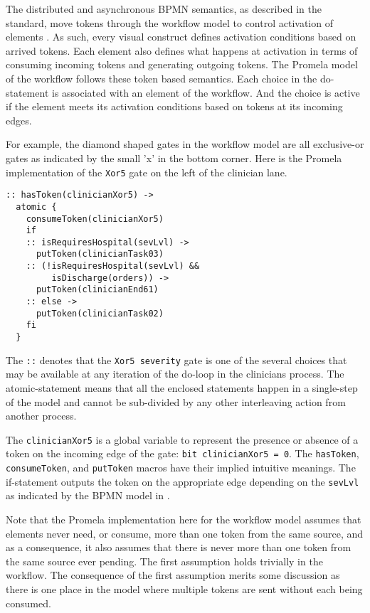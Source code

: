 The distributed and asynchronous BPMN semantics, as described in the standard, move tokens through the workflow model to control activation of elements \cite{BPMNSpecification}. As such, every visual construct defines activation conditions based on arrived tokens. Each element also defines what happens at activation in terms of consuming incoming tokens and generating outgoing tokens. The Promela model of the workflow follows these token based semantics. Each choice in the do-statement is associated with an element of the workflow. And the choice is active if the element meets its activation conditions based on tokens at its incoming edges.

For example, the diamond shaped gates in the workflow model are all exclusive-or gates as indicated by the small 'x' in the bottom corner. Here is the Promela implementation of the \texttt{Xor5} gate on the left of the clinician lane.
%
{\small
\begin{lstlisting}[style=myPromela]
:: hasToken(clinicianXor5) ->
  atomic {
    consumeToken(clinicianXor5)
    if
    :: isRequiresHospital(sevLvl) ->
      putToken(clinicianTask03)
    :: (!isRequiresHospital(sevLvl) && 
         isDischarge(orders)) ->
      putToken(clinicianEnd61)
    :: else ->
      putToken(clinicianTask02)
    fi
  }
\end{lstlisting}
}
% 
\noindent The \texttt{::} denotes that the \texttt{Xor5 severity} gate is one of the several choices that may be available at any iteration of the do-loop in the clinicians process. The atomic-statement means that all the enclosed statements happen in a single-step of the model and cannot be sub-divided by any other interleaving action from another process.

The \texttt{clinicianXor5} is a global variable to represent the presence or absence of a token on the incoming edge of the gate: \texttt{bit clinicianXor5 = 0}. The \texttt{hasToken}, \texttt{consumeToken}, and \texttt{putToken} macros have their implied intuitive meanings. The if-statement outputs the token on the appropriate edge depending on the \texttt{sevLvl} as indicated by the BPMN model in . 

Note that the Promela implementation here for the workflow model assumes that elements never need, or consume, more than one token from the same source, and as a consequence, it also assumes that there is never more than one token from the same source ever pending. The first assumption holds trivially in the workflow. The consequence of the first assumption merits some discussion as there is one place in the model where multiple tokens are sent without each being consumed.

